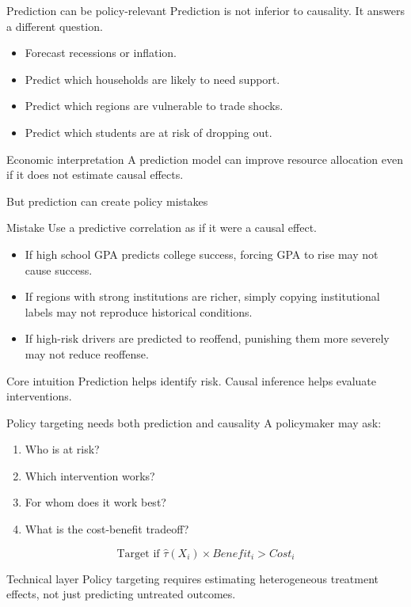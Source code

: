 \documentclass[aspectratio=169,11pt]{beamer}
\newcommand{\core}[1]{\begin{block}{Core intuition}#1\end{block}}
\newcommand{\grad}[1]{\begin{alertblock}{Technical layer}#1\end{alertblock}}
\newcommand{\econ}[1]{\begin{exampleblock}{Economic interpretation}#1\end{exampleblock}}
\begin{document}
\begin{frame}{Prediction can be policy-relevant}
Prediction is not inferior to causality. It answers a different question.
\begin{itemize}
  \item Forecast recessions or inflation.
  \item Predict which households are likely to need support.
  \item Predict which regions are vulnerable to trade shocks.
  \item Predict which students are at risk of dropping out.
\end{itemize}
\econ{
A prediction model can improve resource allocation even if it does not estimate causal effects.
}
\end{frame}

\begin{frame}{But prediction can create policy mistakes}
\begin{alertblock}{Mistake}
Use a predictive correlation as if it were a causal effect.
\end{alertblock}
\begin{itemize}
  \item If high school GPA predicts college success, forcing GPA to rise may not cause success.
  \item If regions with strong institutions are richer, simply copying institutional labels may not reproduce historical conditions.
  \item If high-risk drivers are predicted to reoffend, punishing them more severely may not reduce reoffense.
\end{itemize}
\core{
Prediction helps identify risk. Causal inference helps evaluate interventions.
}
\end{frame}

\begin{frame}{Policy targeting needs both prediction and causality}
A policymaker may ask:
\begin{enumerate}
  \item Who is at risk?
  \item Which intervention works?
  \item For whom does it work best?
  \item What is the cost-benefit tradeoff?
\end{enumerate}
\[
\text{Target if } \widehat{\tau}(X_i)\times Benefit_i > Cost_i
\]
\grad{
Policy targeting requires estimating heterogeneous treatment effects, not just predicting untreated outcomes.
}
\end{frame}
\end{document}
